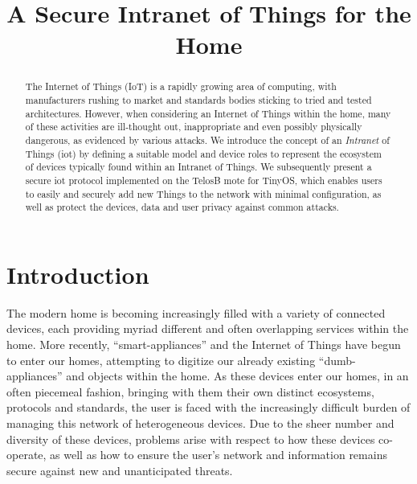 \documentclass[conference]{./sty/IEEEtran}
\begin{document}
%
\title{A Secure Intranet of Things for the Home}


\author{
}

\maketitle


\begin{abstract}
The Internet of Things (IoT) is a rapidly growing area of computing, with manufacturers rushing to market and standards bodies sticking to tried and tested architectures. However, when considering an Internet of Things within the home, many of these activities are ill-thought out, inappropriate and even possibly physically dangerous, as evidenced by various attacks\cite{BelkinWemo,IoTWorm}. We introduce the concept of an \textit{Intranet} of Things (iot) by defining a suitable model and device roles to represent the ecosystem of devices typically found within an Intranet of Things. We subsequently present a secure iot protocol implemented on the TelosB mote for TinyOS, which enables users to easily and securely add new Things to the network with minimal configuration, as well as protect the devices, data and user privacy against common attacks. 
\end{abstract}


\section{Introduction}
The modern home is becoming increasingly filled with a variety of connected devices, each providing myriad different and often overlapping services within the home. More recently, ``smart-appliances'' and the Internet of Things have begun to enter our homes, attempting to digitize our already existing ``dumb-appliances'' and objects within the home. As these devices enter our homes, in an often piecemeal fashion, bringing with them their own distinct ecosystems, protocols and standards, the user is faced with the increasingly difficult burden of managing this network of heterogeneous devices. Due to the sheer number and diversity of these devices, problems arise with respect to how these devices co-operate, as well as how to ensure the user's network and information remains secure against new and unanticipated threats.
\end{document}
